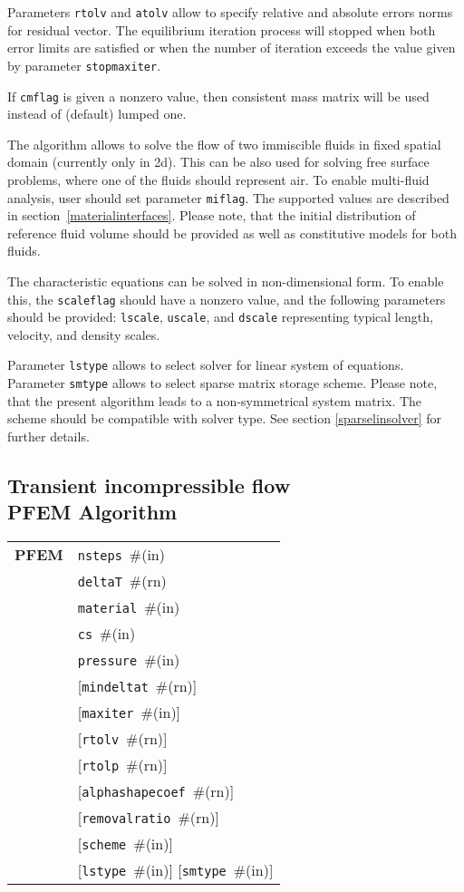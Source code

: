 \documentclass[a4paper]{report}
\newcommand{\param}[1]{\texttt{#1}} %
\newcommand{\optional}[1]{[#1]} %
\newcommand{\field}[2]{\param{#1}~\#{\tiny(#2)}} %
\newcommand{\optField}[2]{\optional{\field{#1}{#2}}}
\newcommand{\entKeywordInst}[1]{\textbf{#1}} %
\newenvironment{record}[1][]{\begin{tabular}{|ll}}{\end{tabular}\\}
\newcommand{\recentry}[2]{{#1}&{#2}\\}
\newcounter{rcc}
\newenvironment{record}[1][\textwidth]{\setcounter{rcc}{0}\rowcolors{1}{lightgray}{lightgray}\tabularx{#1}{llR} \hline}
               {\endtabularx}
\newcommand{\recentry}[2]{\ifthenelse{\value{rcc}>0}{$\backslash$ \\}{\setcounter{rcc}{1}}{#1}&{#2}&}
\begin{document}
Parameters \param{rtolv} and \param{atolv} allow to
specify relative and absolute errors norms for residual vector.
The equilibrium iteration process will stopped when both error limits
are satisfied or when the number of iteration exceeds the value given
by parameter \param{stopmaxiter}.

If \param{cmflag} is given a nonzero value, then
consistent mass matrix will be used instead of (default) lumped one.

The algorithm allows to solve the flow of two immiscible fluids in
fixed spatial domain (currently only in 2d). This can be also used for
solving free surface problems, where one of the fluids should
represent air. To enable multi-fluid analysis, user should set parameter \param{miflag}. The supported values are described in section~\ref{materialinterfaces}.
Please note, that the initial distribution of reference fluid
volume should be provided as well as
constitutive models for both fluids.


The characteristic equations can be solved in non-dimensional form. To
enable this, the \param{scaleflag} should have a nonzero value,
and the following parameters should be provided: \param{lscale},
\param{uscale}, and \param{dscale} representing typical length,
velocity, and density scales.

Parameter \param{lstype} allows to select solver for linear system of
equations. Parameter \param{smtype} allows to select sparse matrix storage
scheme. Please note, that the present algorithm leads to a
non-symmetrical system
matrix. The scheme should be compatible with solver type. See section
\ref{sparselinsolver} for further details.

\subsection{Transient incompressible flow\\PFEM Algorithm}
\label{pfemIncomp}
\begin{record}
  \recentry{\entKeywordInst{PFEM}}{\field{nsteps}{in}}
  \recentry{}{\field{deltaT}{rn}}
  \recentry{}{\field{material}{in}}
  \recentry{}{\field{cs}{in}}
  \recentry{}{\field{pressure}{in}}
  \recentry{}{\optField{mindeltat}{rn}}
  \recentry{}{\optField{maxiter}{in}}
  \recentry{}{\optField{rtolv}{rn}}
  \recentry{}{\optField{rtolp}{rn}}
  \recentry{}{\optField{alphashapecoef}{rn}}
  \recentry{}{\optField{removalratio}{rn}}
  \recentry{}{\optField{scheme}{in}}
  \recentry{}{\optField{lstype}{in} \optField{smtype}{in}}
\end{record}
\end{document}
